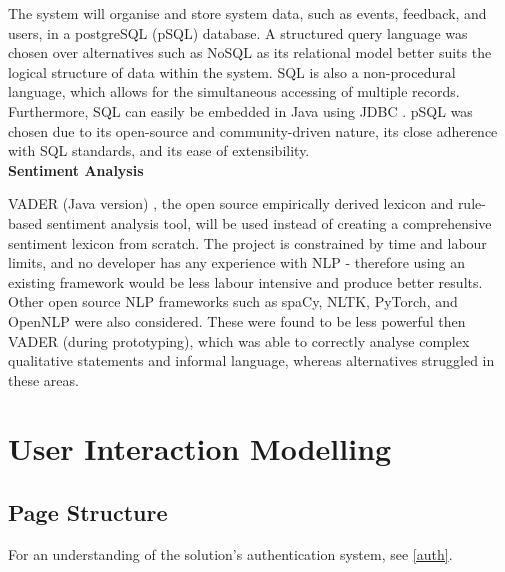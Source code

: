 \documentclass[9pt, titlepage]{extarticle}
\begin{document}
The system will organise and store system data, such as events, feedback, and users, in a postgreSQL (pSQL) \autocite{web:psql} database. A structured query language was chosen over alternatives such as NoSQL as its relational model better suits the logical structure of data within the system. SQL is also a non-procedural language, which allows for the simultaneous accessing of multiple records. Furthermore, SQL can easily be embedded in Java using JDBC \autocite{jdbc}. pSQL was chosen due to its open-source and community-driven nature, its close adherence with SQL standards, and its ease of extensibility. \\

\textbf{Sentiment Analysis} 

VADER \autocite{vader2} (Java version) \autocite{web:vader}, the open source empirically derived lexicon and rule-based sentiment analysis tool, will be used instead of creating a comprehensive sentiment lexicon from scratch. 
The project is constrained by time and labour limits, and no developer has any experience with NLP - therefore using an existing framework would be less labour intensive and produce better results.
Other open source NLP frameworks such as spaCy, NLTK, PyTorch, and OpenNLP were also considered. These were found to be less powerful then VADER (during prototyping), which was able to correctly analyse complex qualitative statements and informal language, whereas alternatives struggled in these areas.\\

\section{User Interaction Modelling}

\subsection{Page Structure}

For an understanding of the solution's authentication system, see \autoref{auth}.
\end{document}
